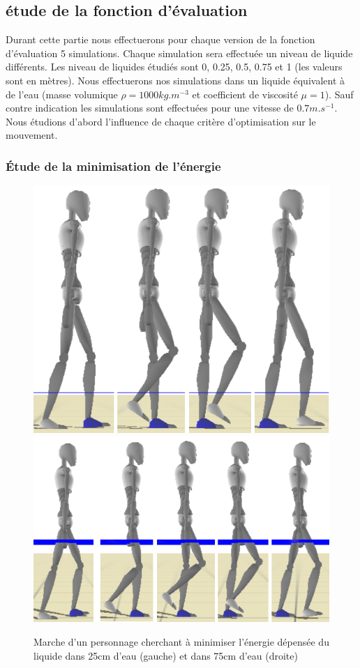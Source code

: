 \documentclass[runningheads,a4paper]{llncs}
\begin{document}
\subsection{étude de la fonction d'évaluation}

Durant cette partie nous effectuerons pour chaque version de la fonction d'évaluation 5 simulations. Chaque simulation sera effectuée un niveau de liquide différents. Les niveau de liquides étudiés sont 0, 0.25, 0.5, 0.75 et 1 (les valeurs sont en mètres). Nous effectuerons nos simulations dans un liquide équivalent à de l'eau (masse volumique $\rho =1000kg.m^{-3}$ et coefficient de viscosité  $\mu =1$). Sauf contre indication les simulations sont effectuées pour une vitesse de $0.7m.s^{-1}$. Nous étudions d'abord l'influence de chaque critère d'optimisation sur le mouvement.

\subsubsection{Étude de la minimisation de l'énergie}

\begin{figure}[h]
\centering
\includegraphics[scale=0.37]{strips/min_torque_25cm.png}
\includegraphics[scale=0.5]{strips/min_torque_75cm.png}
\caption{Marche d'un personnage cherchant à minimiser l'énergie dépensée du liquide dans 25cm d'eau (gauche) et dans 75cm d'eau (droite)}
\label{fig:min_energ}
\end{figure}
\end{document}
